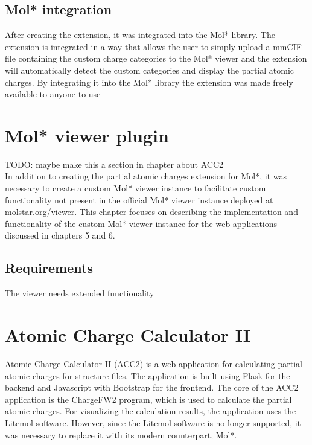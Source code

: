 \documentclass[
  digital,     %
  oneside,     %
  nosansbold,  %
  nocolorbold, %
  lof,         %
  lot,         %
]{fithesis4}
\begin{document}
\section{Mol* integration}

After creating the extension, it was integrated into the Mol* library. The extension is integrated in a way that allows the user to simply upload a mmCIF file containing the custom charge categories to the Mol* viewer and the extension will automatically detect the custom categories and display the partial atomic charges. By integrating it into the Mol* library the extension was made freely available to anyone to use

\chapter{Mol* viewer plugin}
\label{chapter:molstar_viewer_plugin}

TODO: maybe make this a section in chapter about ACC2 \\

In addition to creating the partial atomic charges extension for Mol*, it was necessary to create a custom Mol* viewer instance to facilitate custom functionality not present in the official Mol* viewer instance deployed at molstar.org/viewer. This chapter focuses on describing the implementation and functionality of the custom Mol* viewer instance for the web applications discussed in chapters 5 and 6.

\section{Requirements}

The viewer needs extended functionality

\chapter{Atomic Charge Calculator II}
\label{chapter:atomic_charge_calculator_ii}

Atomic Charge Calculator II (ACC2) is a web application for calculating partial atomic charges for structure files. The application is built using Flask for the backend and Javascript with Bootstrap for the frontend. The core of the ACC2 application is the ChargeFW2 program, which is used to calculate the partial atomic charges. For visualizing the calculation results, the application uses the Litemol software. \cite{racek2020acc2} However, since the Litemol software is no longer supported, it was necessary to replace it with its modern counterpart, Mol*.
\end{document}

